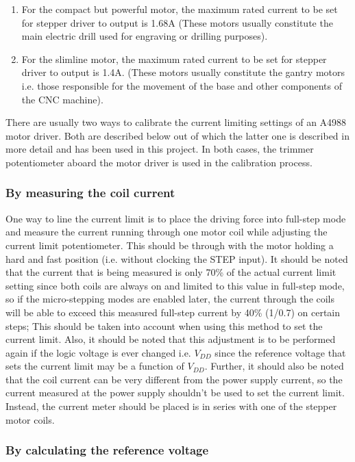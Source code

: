 \begin{enumerate}
    \item For the compact but powerful motor, the maximum rated current to be set for stepper driver to output is 1.68A (These motors usually constitute the main electric drill used for engraving or drilling purposes).
    \item For the slimline motor, the maximum rated current to be set for stepper driver to output is 1.4A. (These motors usually constitute the gantry motors i.e. those responsible for the movement of the base and other components of the CNC machine).
\end{enumerate}

There are usually two ways to calibrate the current limiting settings of an A4988 motor driver. Both are described below out of which the latter one is described in more detail and has been used in this project. In both cases, the trimmer potentiometer aboard the motor driver is used in the calibration process.

\subsubsection*{By measuring the coil current}

One way to line the current limit is to place the driving force into full-step mode and measure the current running through one motor coil while adjusting the current limit potentiometer. This should be through with the motor holding a hard and fast position (i.e. without clocking the STEP input). It should be noted that the current that is being measured is only 70\% of the actual current limit setting since both coils are always on and limited to this value in full-step mode, so if the micro-stepping modes are enabled later, the current through the coils will be able to exceed this measured full-step current by 40\% (1/0.7) on certain steps; This should be taken into account when using this method to set the current limit. Also, it should be noted that this adjustment is to be performed again if the logic voltage is ever changed i.e. $V_{DD}$ since the reference voltage that sets the current limit may be a function of $V_{DD}$. Further, it should also be noted that the coil current can be very different from the power supply current, so the current measured at the power supply shouldn’t be used to set the current limit. Instead, the current meter should be placed is in series with one of the stepper motor coils.

\subsubsection*{By calculating the reference voltage}

